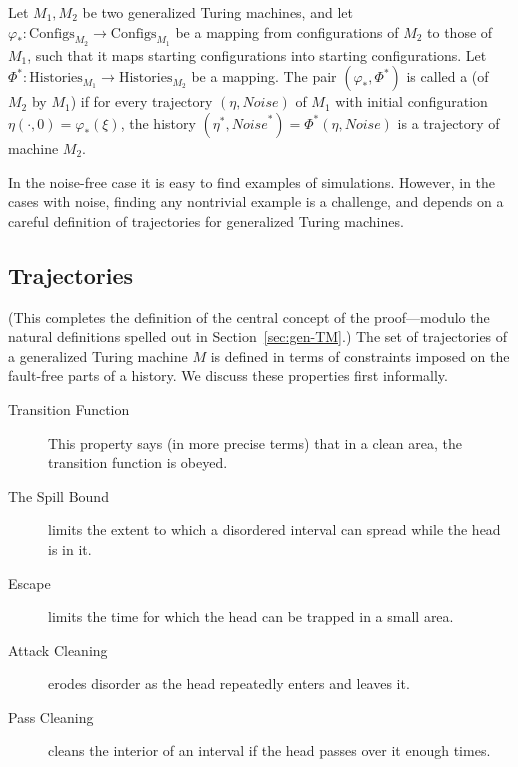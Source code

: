 \documentclass[11pt]{memoir}
\theoremstyle{definition} %
\newcommand{\Configs}{\mathrm{Configs}}
\newcommand{\Noise}{\mathit{Noise}}
\newcommand{\Histories}{\mathrm{Histories}}
\begin{document}
\begin{sloppypar}
\begin{definition}[Simulation] \label{def:simulation-central}
  Let \( M_{1},M_{2} \) be two generalized Turing machines, and let
  \( 
    \varphi_{*}:\Configs_{M_{2}} \to \Configs_{M_{1}} \)
be a mapping from configurations of \( M_{2} \) to those of \( M_{1} \), such that it maps
starting configurations into starting configurations.
Let \(    \Phi^{*}:\Histories_{M_{1}} \to \Histories_{M_{2}} \) be a mapping.
The pair \( (\varphi_{*}, \Phi^{*})  \)
is called a  (of \(  M_{2}  \) by \(  M_{1}  \)) if for every
trajectory \(  (\eta, \Noise)  \) of \( M_{1} \) with initial
configuration \(  \eta(\cdot,0)=\varphi_{*}(\xi)  \),
the history \(  (\eta^{*},\Noise^{*})=\Phi^{*}(\eta,\Noise)  \) is
a trajectory of machine \(  M_{2}  \).
\end{definition}
  \end{sloppypar}

In the noise-free case it is easy to find examples of simulations.
However, in the cases with noise, finding any nontrivial example 
is a challenge, and depends on a careful definition of trajectories for generalized Turing machines.

\subsection{Trajectories}\label{sec:traj}

(This completes the definition of the central concept of the
proof---modulo the natural definitions spelled out in Section~\ref{sec:gen-TM}.)
The set of trajectories of a generalized Turing machine \( M \)
is defined in terms of constraints imposed on the fault-free parts of a history.
We discuss these properties first informally.

\begin{description}
\item[Transition Function] This property says (in more precise terms)
that in a clean area, the transition function is obeyed.

\item[The Spill Bound] limits the extent to which a disordered interval can spread while
the head is in it.

\item[Escape] limits the time for which the head can be trapped in a small area.

\item[Attack Cleaning] erodes disorder as the head repeatedly enters and leaves it.

\item[Pass Cleaning] cleans the interior of an
  interval if the head passes over it enough times.
  
\end{description}
\end{document}

